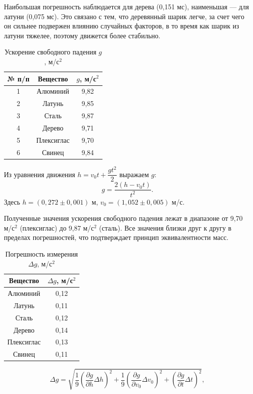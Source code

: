 \documentclass[a4paper,14pt]{extarticle}
\theoremstyle{plain}
\theoremstyle{remark}
\theoremstyle{definition}
\begin{document}
 Наибольшая погрешность наблюдается для дерева (0,151 мс), наименьшая — для латуни (0,075 мс). Это связано с тем, что деревянный шарик легче, за счет чего он сильнее подвержен влиянию случайных факторов, в то время как шарик из латуни тяжелее, поэтому движется более стабильно.

\begin{table}[H]
\centering
\caption{Ускорение свободного падения $g$, м/с$^2$}
\label{tabl:4}
\begin{tabular}{|c|c|c|}
\hline
№ п/п & Вещество & $g$, м/с$^2$ \\
\hline
1 & Алюминий & 9,82 \\
\hline
2 & Латунь & 9,85 \\
\hline
3 & Сталь & 9,87 \\
\hline
4 & Дерево & 9,71 \\
\hline
5 & Плексиглас & 9,70 \\
\hline
6 & Свинец & 9,84 \\
\hline
\end{tabular}
\end{table}
Из уравнения движения $h = v_0 t + \dfrac{gt^2}{2}$ выражаем $g$:
\begin{equation}
g = \frac{2(h - v_0 t)}{t^2}. \tag{8}
\end{equation}
Здесь $h = (0,272 \pm 0,001)$ м, $v_0 = (1,052 \pm 0,005)$ м/с.

Полученные значения ускорения свободного падения лежат в диапазоне от 9,70 м/с$^2$ (плексиглас) до 9,87 м/с$^2$ (сталь). Все значения близки друг к другу в пределах погрешностей, что подтверждает принцип эквивалентности масс.

\begin{table}[H]
\centering
\caption{Погрешность измерения $\Delta g$, м/с$^2$}
\label{tabl:5}
\begin{tabular}{|c|c|}
\hline
Вещество & $\Delta g$, м/с$^2$ \\
\hline
Алюминий & 0,12 \\
\hline
Латунь & 0,11 \\
\hline
Сталь & 0,12 \\
\hline
Дерево & 0,14 \\
\hline
Плексиглас & 0,13 \\
\hline
Свинец & 0,11 \\
\hline
\end{tabular}
\end{table}
\vspace{3mm}
\begin{equation}
\Delta g = \sqrt{\frac{1}{9}\left(\frac{\partial g}{\partial h}\Delta h\right)^2 + \frac{1}{9}\left(\frac{\partial g}{\partial v_0}\Delta v_0\right)^2 + \left(\frac{\partial g}{\partial t}\Delta t\right)^2}, \tag{9}
\end{equation}
\end{document}
